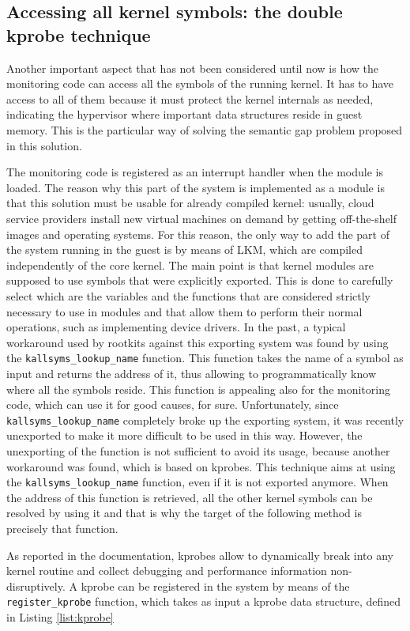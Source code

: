 \subsection{Accessing all kernel symbols: the double kprobe technique}
Another important aspect that has not been considered until now is how the monitoring code can access all the symbols of the running kernel. It has to have access to all of them because it must protect the kernel internals as needed, indicating the hypervisor where important data structures reside in guest memory. This is the particular way of solving the semantic gap problem proposed in this solution.
\par The monitoring code is registered as an interrupt handler when the module is loaded. The reason why this part of the system is implemented as a module is that this solution must be usable for already compiled kernel: usually, cloud service providers install new virtual machines on demand by getting off-the-shelf images and operating systems. For this reason, the only way to add the part of the system running in the guest is by means of LKM, which are compiled independently of the core kernel. The main point is that kernel modules are supposed to use symbols that were explicitly exported. This is done to carefully select which are the variables and the functions that are considered strictly necessary to use in modules and that allow them to perform their normal operations, such as implementing device drivers. In the past, a typical workaround used by rootkits against this exporting system was found by using the \texttt{kallsyms\_lookup\_name} function. This function takes the name of a symbol as input and returns the address of it, thus allowing to programmatically know where all the symbols reside. This function is appealing also for the monitoring code, which can use it for good causes, for sure. Unfortunately, since \texttt{kallsyms\_lookup\_name} completely broke up the exporting system, it was recently unexported to make it more difficult to be used in this way. However, the unexporting of the function is not sufficient to avoid its usage, because another workaround was found, which is based on kprobes. This technique aims at using the \texttt{kallsyms\_lookup\_name} function, even if it is not exported anymore. When the address of this function is retrieved, all the other kernel symbols can be resolved by using it and that is why the target of the following method is precisely that function.
\par
As reported in the documentation, kprobes allow to dynamically break into any kernel routine and collect debugging and performance information non-disruptively. A kprobe can be registered in the system by means of the \texttt{register\_kprobe} function, which takes as input a kprobe data structure, defined in Listing \ref{list:kprobe}

